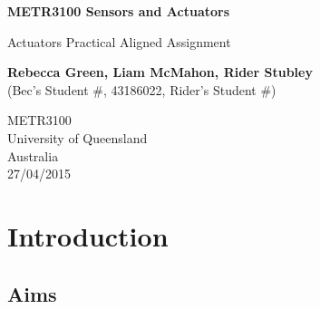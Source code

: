 \documentclass[12pt]{report}
\title{}
\author{Rebecca Green, Liam McMahon, Rider Stubley}
\begin{document}
	
	\begin{titlepage}
		\begin{center}
			\vspace*{1cm}
			
			\textbf{METR3100 Sensors and Actuators}
			
			\vspace{0.5cm}
			Actuators Practical Aligned Assignment
			
			\vspace{1.5cm}
			\textbf{Rebecca Green, Liam McMahon, Rider Stubley} \\
			\vspace{0.5cm}
			(Bec's Student \#, 43186022, Rider's Student \#)
			
			\vfill
			
			METR3100 \\
			University of Queensland \\
			Australia \\
			27/04/2015 \\
		\end{center}
	\end{titlepage}
	
	\begin{abstract}
		
	\end{abstract}
	
	\tableofcontents
	
	\chapter{Introduction}
	
	\section{Aims}
	
\end{document}
